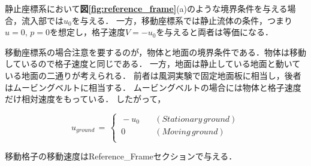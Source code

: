 静止座標系において\textbf{図\ref{fig:reference_frame}}(a)のような境界条件を与える場合，流入部では$u_{0}$を与える．
一方，移動座標系では静止流体の条件，つまり$u=0,\,p=0$を想定し，格子速度$V=-u_{0}$を与えると両者は等価になる．

移動座標系の場合注意を要するのが，物体と地面の境界条件である．物体は移動しているので格子速度と同じである．
一方，地面は静止している地面と動いている地面の二通りが考えられる．
前者は風洞実験で固定地面板に相当し，後者はムービングベルトに相当する．
ムービングベルトの場合には物体と格子速度だけ相対速度をもっている．
したがって，

\begin{equation}
u_{ground}\,=\,
\begin{cases}
\, -u_{0} & \quad (Stationary\,ground)\\
\, 0 & \quad (Moving\,ground)\\
\end{cases}
\label{eq:relative velocity wall}
\end{equation}

移動格子の移動速度はReference\_Frameセクションで与える．

